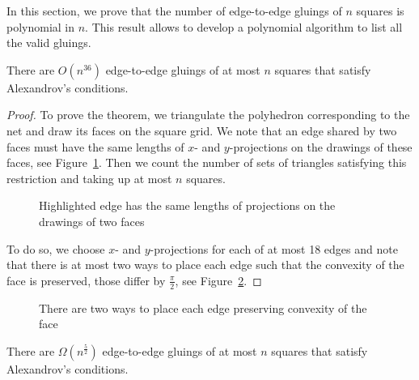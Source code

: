 \documentclass[a4paper,USenglish,cleveref, autoref, thm-restate]{socg-lipics-v2019}
\begin{document}
In this section, we prove that the number of edge-to-edge gluings of $n$ squares is polynomial in $n$. This result allows to develop a polynomial algorithm to list all the valid gluings.

\begin{theorem} \label{thm:n36}
	There are $O \left( n^{36} \right)$ edge-to-edge gluings of at most $n$ squares that satisfy Alexandrov's conditions.
\end{theorem}

\begin{proof} To prove the theorem, we triangulate the polyhedron corresponding to the net and draw its faces on the square grid. We note that an edge shared by two faces must have the same lengths of $x$- and $y$-projections on the drawings of these faces, see Figure~\ref{fig:edgesMeeting}. Then we count the number of sets of triangles satisfying this restriction and taking up at most $n$ squares.

\begin{figure}[h] \centering
{}\hspace{1.2cm}
\caption{Highlighted edge has the same lengths of projections on the drawings of two faces}
\label{fig:edgesMeeting}
\end{figure}

To do so, we choose $x$- and $y$-projections for each of at most 18 edges and note that there is at most two ways to place each edge such that the convexity of the face is preserved, those differ by $\frac{\pi}{2}$, see Figure~\ref{fig:twoWays}. \end{proof}

\begin{figure}[h] \centering
{}
\caption{There are two ways to place each edge preserving convexity of the face}
\label{fig:twoWays}
\end{figure}

\begin{theorem} \label{thm:n52}
	There are $\Omega \left( n^{\frac52} \right)$ edge-to-edge gluings of at most $n$ squares that satisfy Alexandrov's conditions.
\end{theorem}
\end{document}
